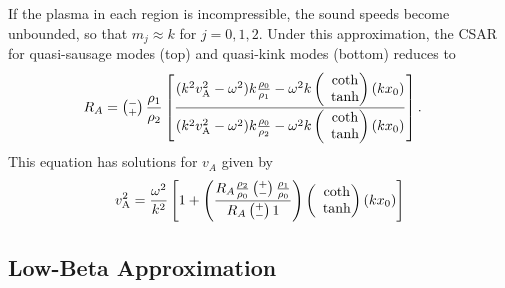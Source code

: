 \documentclass[namedreferences]{solarphysics}
\numberwithin{equation}{section}
\begin{document}
\begin{article}
If the plasma in each region is incompressible, the sound speeds become unbounded, so that $m_j \approx k$ for $j = 0,1,2$. Under this approximation, the CSAR for quasi-sausage modes (top) and quasi-kink modes (bottom) reduces to
\begin{align}
R_A &= \left(\substack{- \\ +}\right) \frac{\rho_1}{\rho_2} \left[ \frac{(k^2v_\textrm{A}^2-\omega^2)k\frac{\rho_0}{\rho_1}-\omega^2k \left(\hspace{-0.07in}\begin{matrix} &\coth \\ &\tanh \end{matrix}\right)(kx_0)}{(k^2v_\textrm{A}^2-\omega^2)k\frac{\rho_0}{\rho_2}-\omega^2k \left(\hspace{-0.07in}\begin{matrix} &\coth \\ &\tanh \end{matrix}\right)(kx_0)} \right].
\end{align}
This equation has solutions for $v_A$ given by
\begin{equation}
v_\textrm{A}^2 = \frac{\omega^2}{k^2} \left[ 1 + \left( \frac{R_A \frac{\rho_2}{\rho_0} \left(\substack{+ \\ -}\right) \frac{\rho_1}{\rho_0}}{R_A \left(\substack{+ \\ -}\right) 1} \right) \left(\hspace{-0.07in}\begin{matrix} &\coth \\ &\tanh \end{matrix}\right) (kx_0)\right]
\end{equation}

\subsection{Low-Beta Approximation} \label{sec: low-beta}


\end{article}
\end{document}
